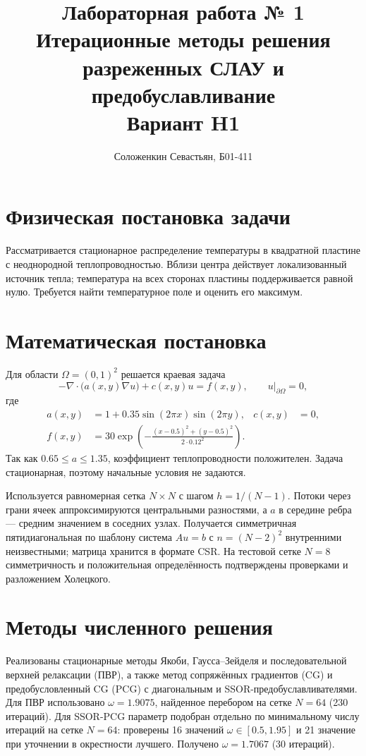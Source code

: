 \documentclass[a4paper,12pt]{article}
\title{Лабораторная работа № 1\\Итерационные методы решения\\разреженных СЛАУ и предобуславливание\\Вариант H1}
\author{Соложенкин Севастьян, Б01-411}
\date{}
\begin{document}
\maketitle
\newpage

\section{Физическая постановка задачи}
Рассматривается стационарное распределение температуры в квадратной пластине с неоднородной теплопроводностью. Вблизи центра действует локализованный источник тепла; температура на всех сторонах пластины поддерживается равной нулю. Требуется найти температурное поле и оценить его максимум.

\section{Математическая постановка}
Для области $\Omega=(0,1)^2$ решается краевая задача
\begin{equation}
    -\nabla\!\cdot\!\bigl(a(x,y)\nabla u\bigr)+c(x,y)u=f(x,y),
    \qquad u\big|_{\partial\Omega}=0,
    \label{eq:pde}
\end{equation}
где
\begin{align*}
    a(x,y) & =1+0.35\sin(2\pi x)\sin(2\pi y),                                 & c(x,y) & =0, \\
    f(x,y) & =30\exp\!\left(-\frac{(x-0.5)^2+(y-0.5)^2}{2\cdot0.12^2}\right).
\end{align*}
Так как $0.65\leq a\leq1.35$, коэффициент теплопроводности положителен. Задача стационарная, поэтому начальные условия не задаются.

Используется равномерная сетка $N\times N$ с шагом $h=1/(N-1)$. Потоки через грани ячеек аппроксимируются центральными разностями, а $a$ в середине ребра --- средним значением в соседних узлах. Получается симметричная пятидиагональная по шаблону система $Au=b$ с $n=(N-2)^2$ внутренними неизвестными; матрица хранится в формате CSR. На тестовой сетке $N=8$ симметричность и положительная определённость подтверждены проверками и разложением Холецкого.

\section{Методы численного решения}
Реализованы стационарные методы Якоби, Гаусса--Зейделя и последовательной верхней релаксации (ПВР), а также метод сопряжённых градиентов (CG) и предобусловленный CG (PCG) с диагональным и SSOR-предобуславливателями. Для ПВР использовано $\omega=1.9075$, найденное перебором на сетке $N=64$ (230 итераций). Для SSOR-PCG параметр подобран отдельно по минимальному числу итераций на сетке $N=64$: проверены 16 значений $\omega\in[0.5,1.95]$ и 21 значение при уточнении в окрестности лучшего. Получено $\omega=1.7067$ (30 итераций).
\end{document}
